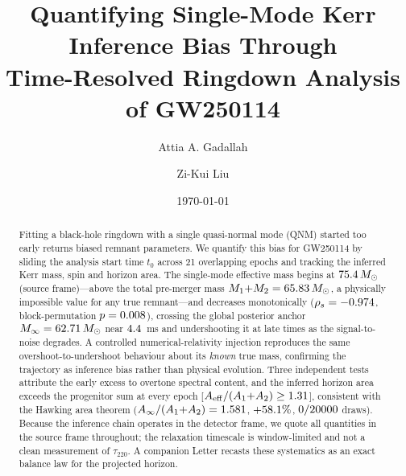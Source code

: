 \documentclass[aps,prd,twocolumn,superscriptaddress,nofootinbib,longbibliography]{revtex4-2}
\newcommand{\Aeff}{A_{\rm eff}}\newcommand{\Msun}{M_\odot}\newcommand{\tstart}{t_0}
\begin{document}
\title{Quantifying Single-Mode Kerr Inference Bias Through\\
Time-Resolved Ringdown Analysis of GW250114}
\author{Attia A. Gadallah}
\author{Zi-Kui Liu}
\date{\today}

\begin{abstract}
Fitting a black-hole ringdown with a single quasi-normal mode (QNM) started too
early returns biased remnant parameters. We quantify this bias for GW250114 by
sliding the analysis start time $\tstart$ across 21 overlapping epochs and
tracking the inferred Kerr mass, spin and horizon area. The single-mode
effective mass begins at $\Mearly\,\Msun$ (source frame)---above the total
pre-merger mass $M_1{+}M_2=\Mtwelve\,\Msun$, a physically impossible value for
any true remnant---and decreases monotonically ($\rho_s=-0.974$, block-permutation
$p=0.008$), crossing the global posterior anchor $M_\infty=\Minf\,\Msun$ near
$4.4$~ms and undershooting it at late times as the signal-to-noise
degrades. A controlled numerical-relativity injection reproduces the same
overshoot-to-undershoot behaviour about its \emph{known} true mass, confirming
the trajectory as inference bias rather than physical evolution. Three
independent tests attribute the early excess to overtone spectral content, and
the inferred horizon area exceeds the progenitor sum at every epoch
[$\Aeff/(A_1{+}A_2)\ge\Rareamin$], consistent with the Hawking area theorem
($A_\infty/(A_1{+}A_2)=1.581$, $+58.1\%$, $0/20000$ draws). Because
the inference chain operates in the detector frame, we quote all quantities in
the source frame throughout; the relaxation timescale is window-limited and not
a clean measurement of $\tau_{220}$. A companion Letter recasts these
systematics as an exact balance law for the projected horizon.
\end{abstract}
\maketitle
\end{document}
